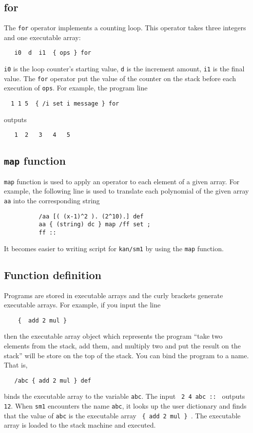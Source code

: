 \subsection{for}
The {\tt for} operator implements a counting loop.
This operator takes three integers and one executable array:
\begin{verbatim}
   i0  d  i1  { ops } for
\end{verbatim}
{\tt i0} is the loop counter's starting value,
{\tt d} is the increment amount,
{\tt i1} is the final value.
The {\tt for} operator put the value of the counter on the stack before
each execution of {\tt ops}.
For example, the program line
\begin{verbatim}
  1 1 5  { /i set i message } for
\end{verbatim}
outputs
\begin{verbatim}
   1  2   3   4   5 
\end{verbatim}



\subsection{{\tt map} function}

{\tt map} function is used to apply an operator to each element
of a given array.
For example, the following line is used to translate each polynomial
of the given array {\tt aa} into the corresponding string
\begin{verbatim}
          /aa [( (x-1)^2 ). (2^10).] def
          aa { (string) dc } map /ff set ;
          ff ::
\end{verbatim}
It becomes easier to writing script for {\tt kan/sm1} by using the {\tt map}
function.

\subsection{Function definition}

Programs are stored in executable arrays and
the curly brackets generate executable arrays.
For example, if you input the line
\begin{verbatim}
    {  add 2 mul }
\end{verbatim}
then the executable array object which represents the program
``take two elements from the stack, add them, and multiply two 
and put the result on the stack''
will be store on the top of the stack.
You can bind the program to a name.
That is, 
\begin{verbatim}
   /abc { add 2 mul } def
\end{verbatim}
binds the executable array to the variable {\tt abc}.
The input \verb+ 2 4 abc :: + outputs {\tt 12}.
When {\tt sm1} encounters the name {\tt abc},
it looks up the user dictionary and finds that
the value of {\tt abc} is the executable array
\verb+ { add 2 mul } +.
The executable array is loaded to the stack machine and
executed.

